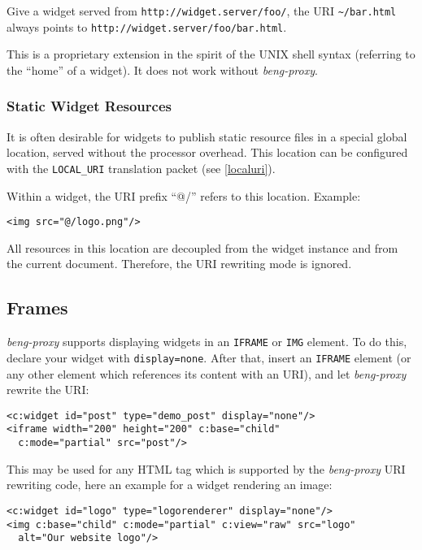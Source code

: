 \documentclass[a4paper,12pt]{article}
\begin{document}
Give a widget served from \texttt{http://widget.server/foo/}, the URI
\texttt{\~{}/bar.html} always points to
\texttt{http://widget.server/foo/bar.html}.

This is a proprietary extension in the spirit of the UNIX shell syntax
(referring to the ``home'' of a widget).  It does not work without
\emph{beng-proxy}.

\subsubsection{Static Widget Resources}
\label{uriat}

It is often desirable for widgets to publish static resource files in
a special global location, served without the processor overhead.
This location can be configured with the \verb|LOCAL_URI| translation
packet (see \ref{localuri}).

Within a widget, the URI prefix ``@/'' refers to this location.
Example:

\begin{verbatim}
<img src="@/logo.png"/>
\end{verbatim}

All resources in this location are decoupled from the widget instance
and from the current document.  Therefore, the URI rewriting mode is
ignored.

\subsection{Frames}
\label{frames}

\emph{beng-proxy} supports displaying widgets in an \texttt{IFRAME} or
\texttt{IMG} element.  To do this, declare your widget with
\texttt{display=none}.  After that, insert an \texttt{IFRAME} element
(or any other element which references its content with an URI), and
let \emph{beng-proxy} rewrite the URI:

\begin{verbatim}
<c:widget id="post" type="demo_post" display="none"/>
<iframe width="200" height="200" c:base="child"
  c:mode="partial" src="post"/>
\end{verbatim}

This may be used for any HTML tag which is supported by the
\emph{beng-proxy} URI rewriting code, here an example for a widget
rendering an image:

\begin{verbatim}
<c:widget id="logo" type="logorenderer" display="none"/>
<img c:base="child" c:mode="partial" c:view="raw" src="logo"
  alt="Our website logo"/>
\end{verbatim}
\end{document}
